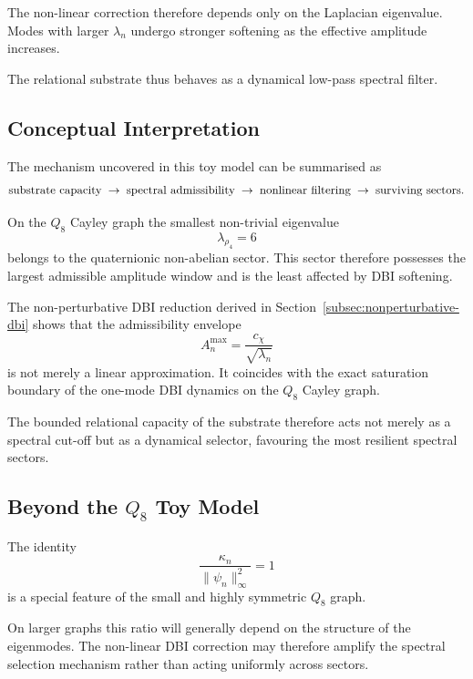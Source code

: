     The non-linear correction therefore depends only on the Laplacian
    eigenvalue.
    Modes with larger $\lambda_n$ undergo stronger softening as the
    effective amplitude increases.

    The relational substrate thus behaves as a dynamical low-pass spectral
    filter.

  \subsection{Conceptual Interpretation}

    The mechanism uncovered in this toy model can be summarised as
    \[
      \text{sub\-strate capacity}
      \;\rightarrow\;
      \text{spectral admissibility}
      \;\rightarrow\;
      \text{nonlinear filtering}
      \;\rightarrow\;
      \text{surviving sectors}.
    \]

    On the $Q_8$ Cayley graph the smallest non-trivial eigenvalue
    \[
      \lambda_{\rho_4}=6
    \]
    belongs to the quaternionic non-abelian sector.
    This sector therefore possesses the largest admissible amplitude window
    and is the least affected by DBI softening.

    The non-perturbative DBI reduction derived in
    Section~\ref{subsec:nonperturbative-dbi} shows that the admissibility
    envelope
    \[
      A_n^{\max} = \frac{c_\chi}{\sqrt{\lambda_n}}
    \]
    is not merely a linear approximation.
    It coincides with the exact saturation boundary of the one-mode
    DBI dynamics on the $Q_8$ Cayley graph.

    The bounded relational capacity of the substrate therefore acts
    not merely as a spectral cut-off but as a dynamical selector,
    favouring the most resilient spectral sectors.

  \subsection{Beyond the $Q_8$ Toy Model}

    The identity
    \[
      \frac{\kappa_n}{\|\psi_n\|_\infty^2}=1
    \]
    is a special feature of the small and highly symmetric $Q_8$ graph.

    On larger graphs this ratio will generally depend on the structure of
    the eigenmodes.
    The non-linear DBI correction may therefore amplify the spectral
    selection mechanism rather than acting uniformly across sectors.
